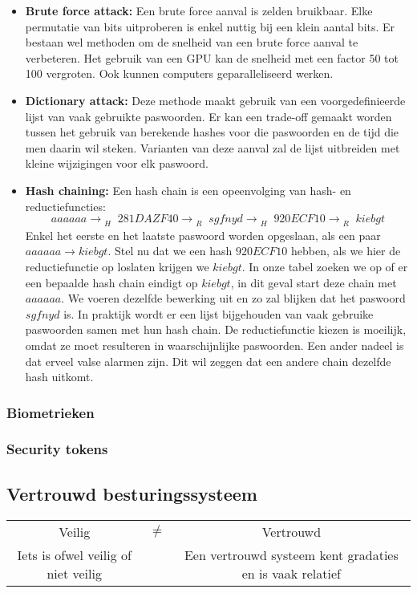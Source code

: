 \documentclass{report}
\begin{document}
	\begin{itemize} 
		\item[\info] \textbf{Brute force attack:} Een brute force aanval is zelden bruikbaar. Elke permutatie van bits uitproberen is enkel nuttig bij een klein aantal bits. Er bestaan wel methoden om de snelheid van een brute force aanval te verbeteren. Het gebruik van een GPU kan de snelheid met een factor 50 tot 100 vergroten. Ook kunnen computers geparalleliseerd werken.
		\item[\info] \textbf{Dictionary attack:} Deze methode maakt gebruik van een voorgedefinieerde lijst van vaak gebruikte paswoorden. Er kan een trade-off gemaakt worden tussen het gebruik van berekende hashes voor die paswoorden en de tijd die men daarin wil steken. Varianten van deze aanval zal de lijst uitbreiden met kleine wijzigingen voor elk paswoord.
		\item[\info] \textbf{Hash chaining:} Een hash chain is een opeenvolging van hash- en reductiefuncties:
		$$aaaaaa \rightarrow_{\substack{H}} 281DAZF40 \rightarrow_{\substack{R}}  sgfnyd \rightarrow_{\substack{H}}  920ECF10 \rightarrow_{\substack{R}}  kiebgt$$
		Enkel het eerste en het laatste paswoord worden opgeslaan, als een paar $aaaaaa \rightarrow kiebgt$. Stel nu dat we een hash $920ECF10$ hebben, als we hier de reductiefunctie op loslaten krijgen we $kiebgt$.  In onze tabel zoeken we op of er een bepaalde hash chain eindigt op $kiebgt$, in dit geval start deze chain met $aaaaaa$. We voeren dezelfde bewerking uit en zo zal blijken dat het paswoord $sgfnyd$ is. In praktijk wordt er een lijst bijgehouden van vaak gebruike paswoorden samen met hun hash chain. De reductiefunctie kiezen is moeilijk, omdat ze moet resulteren in waarschijnlijke paswoorden. Een ander nadeel is dat erveel valse alarmen zijn. Dit wil zeggen dat een andere chain dezelfde hash uitkomt. 
	\end{itemize}
	\subsubsection{Biometrieken}
	\subsubsection{Security tokens}
	\subsection{Vertrouwd besturingssysteem}

	\begin{table}[ht]
		\centering
		\begin{tabular}{c c c}
			Veilig & $\neq$  & Vertrouwd \\

			Iets is ofwel veilig of niet veilig & & Een vertrouwd systeem kent gradaties en is vaak relatief
		\end{tabular}
	\end{table}
\end{document}
